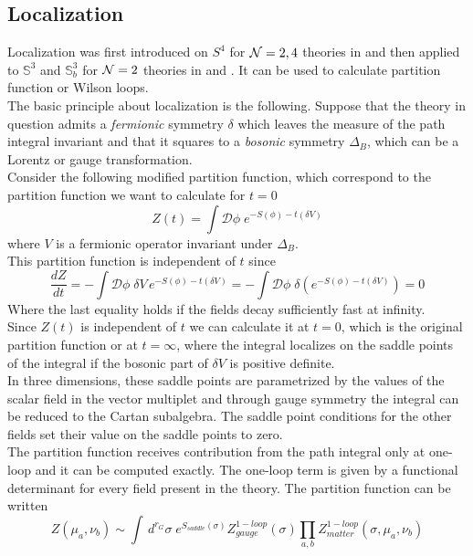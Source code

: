 \subsection{Localization}
Localization was first introduced on $S^4$ for $\mathcal{N}=2,4$ theories in \cite{Pestun:2007rz} and then applied to $\mathbb{S}^3$ and $\mathbb{S}_b^3$ for $\mathcal{N}=2$ theories in \cite{Kapustin:2009kz} and \cite{Hama:2011ea}.
It can be used to calculate partition function or Wilson loops. \\
The basic principle about localization is the following.
Suppose that the theory in question admits a \emph{fermionic} symmetry $\delta$ which leaves the measure of the path integral invariant and that it squares to a \emph{bosonic} symmetry $\Delta_B$, which can be a Lorentz or gauge transformation.\\
Consider the following modified partition function, which correspond to the partition function we want to calculate for $t=0$
\begin{equation}
Z(t) = \int \mathcal{D} \phi \; e^{- S(\phi) - t (\delta V)}
\end{equation}
where $V$ is a fermionic operator invariant under $\Delta_B$.\\
This partition function is independent of $t$ since
\begin{equation}
 \frac{d Z}{d t} = - \int \mathcal{D} \phi \; \delta V \, e^{- S(\phi) - t (\delta V)} =  - \int  \mathcal{D} \phi \; \delta \left( e^{- S(\phi) - t (\delta V)  }\right) = 0
\end{equation}
Where the last equality holds if the fields decay sufficiently fast at infinity.\\
Since $Z(t)$ is independent of $t$ we can calculate it at $t=0$, which is the original partition function or at $t=\infty$, where the integral localizes on the saddle points of the integral if the bosonic part of $\delta V$ is positive definite.\\
In three dimensions, these saddle points are parametrized by the values of the scalar field in the vector multiplet and through gauge symmetry the integral can be reduced to the Cartan subalgebra. 
The saddle point conditions for the other fields set their value on the saddle points to zero.\\
The partition function receives contribution from the path integral only at one-loop and it can be computed exactly.
The one-loop term is given by a functional determinant for every field present in the theory.
The partition function can be written 
\begin{equation}
 Z (\mu_a , \nu_b) \sim \int \, d^{r_G} \sigma \; e^{S_{saddle}(\sigma)} Z_{gauge}^{1-loop}(\sigma ) \prod_{a,b} Z_{matter}^{1-loop}(\sigma,\mu_a,\nu_b)
\end{equation}

